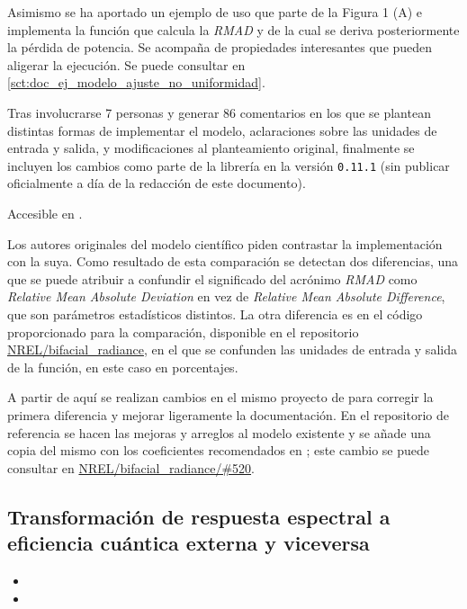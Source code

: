Asimismo se ha aportado un ejemplo de uso que parte de la Figura 1 (A) e implementa la función que calcula la \textit{RMAD} y de la cual se deriva posteriormente la pérdida de potencia. Se acompaña de propiedades interesantes que pueden aligerar la ejecución. Se puede consultar en \ref{sct:doc_ej_modelo_ajuste_no_uniformidad}.

Tras involucrarse 7 personas y generar 86 comentarios en los que se plantean distintas formas de implementar el modelo, aclaraciones sobre las unidades de entrada y salida, y modificaciones al planteamiento original, finalmente se incluyen los cambios como parte de la librería en la versión \texttt{0.11.1} (sin publicar oficialmente a día de la redacción de este documento).

Accesible en .

Los autores originales del modelo científico piden contrastar la implementación con la suya. Como resultado de esta comparación se detectan dos diferencias, una que se puede atribuir a confundir el significado del acrónimo \textit{RMAD} como \textit{Relative Mean Absolute Deviation} en vez de \textit{Relative Mean Absolute Difference}, que son parámetros estadísticos distintos. La otra diferencia es en el código proporcionado para la comparación, disponible en el repositorio \href{https://github.com/NREL/bifacial_radiance/}{NREL/bifacial\_radiance}, en el que se confunden las unidades de entrada y salida de la función, en este caso en porcentajes.

A partir de aquí se realizan cambios en el mismo proyecto de \pvlibpy{} para corregir la primera diferencia y mejorar ligeramente la documentación. En el repositorio de referencia se hacen las mejoras y arreglos al modelo existente y se añade una copia del mismo con los coeficientes recomendados en \cite{Deline_Ayala_Pelaez_MacAlpine_Olalla_2020}; este cambio se puede consultar en \href{https://github.com/NREL/bifacial_radiance/pull/520}{NREL/bifacial\_radiance/\#520}.

\subsection{Transformación de respuesta espectral a eficiencia cuántica externa y viceversa}

\begin{itemize}
    \item {}
    \item {}
\end{itemize}

